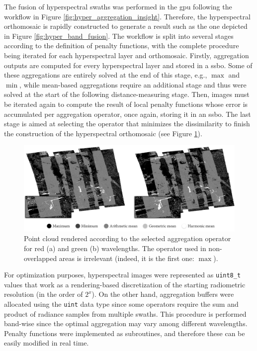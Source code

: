 The fusion of hyperspectral swaths was performed in the \acrshort{gpu} following the workflow in Figure \ref{fig:hyper_aggregation_insight}. Therefore, the hyperspectral orthomosaic is rapidly constructed to generate a result such as the one depicted in Figure \ref{fig:hyper_band_fusion}. The workflow is split into several stages according to the definition of penalty functions, with the complete procedure being iterated for each hyperspectral layer and orthomosaic. Firstly, aggregation outputs are computed for every hyperspectral layer and stored in a \acrshort{ssbo}. Some of these aggregations are entirely solved at the end of this stage, e.g., $\max$ and $\min$, while mean-based aggregations require an additional stage and thus were solved at the start of the following distance-measuring stage. Then, images must be iterated again to compute the result of local penalty functions whose error is accumulated per aggregation operator, once again, storing it in an \acrshort{ssbo}. The last stage is aimed at selecting the operator that minimizes the dissimilarity to finish the construction of the hyperspectral orthomosaic (see Figure \ref{fig:hyper_aggregation_selection}). 

\begin{figure}[hbt]
    \centering
    \includegraphics[width=\linewidth]{figs/hyper_point_cloud/aggregation_selection.png}
	\caption{Point cloud rendered according to the selected aggregation operator for red (a) and green (b) wavelengths. The operator used in non-overlapped areas is irrelevant (indeed, it is the first one: $\max$). }
	\label{fig:hyper_aggregation_selection}
\end{figure}

For optimization purposes, hyperspectral images were represented as \verb|uint8_t| values that work as a rendering-based discretization of the starting radiometric resolution (in the order of $2^x$). On the other hand, aggregation buffers were allocated using the \verb|uint| data type since some operators require the sum and product of radiance samples from multiple swaths. This procedure is performed band-wise since the optimal aggregation may vary among different wavelengths. Penalty functions were implemented as subroutines, and therefore these can be easily modified in real time.

